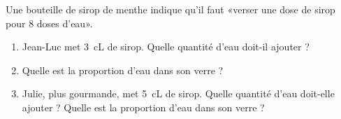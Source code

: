
\begin{exercice}\label{exosmath-0971}

    Une bouteille de sirop de menthe indique qu'il faut «verser une dose de sirop pour \( 8\) doses d'eau». 
    \begin{enumerate}
        \item
            Jean-Luc met \SI{3}{\centi\liter} de sirop. Quelle quantité d'eau doit-il ajouter ?
        \item
            Quelle est la proportion d'eau dans son verre ?
        \item
            Julie, plus gourmande, met \SI{5}{\centi\liter} de sirop. Quelle quantité d'eau doit-elle ajouter ? Quelle est la proportion d'eau dans son verre ?
    \end{enumerate}

\end{exercice}
